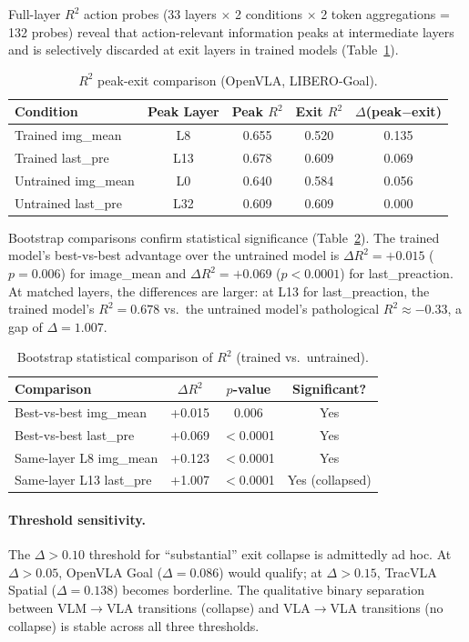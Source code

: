 \documentclass[10pt,letterpaper]{article}
\begin{document}
Full-layer $R^2$ action probes (33 layers $\times$ 2 conditions $\times$ 2 token aggregations = 132 probes) reveal that action-relevant information peaks at intermediate layers and is selectively discarded at exit layers in trained models (Table~\ref{tab:r2_profile}).

\begin{table}[h]
\centering
\caption{$R^2$ peak-exit comparison (OpenVLA, LIBERO-Goal).}
\label{tab:r2_profile}
\begin{tabular}{lcccc}
\toprule
Condition & Peak Layer & Peak $R^2$ & Exit $R^2$ & $\Delta$(peak$-$exit) \\
\midrule
Trained img\_mean & L8 & 0.655 & 0.520 & 0.135 \\
Trained last\_pre & L13 & 0.678 & 0.609 & 0.069 \\
Untrained img\_mean & L0 & 0.640 & 0.584 & 0.056 \\
Untrained last\_pre & L32 & 0.609 & 0.609 & 0.000 \\
\bottomrule
\end{tabular}
\end{table}

Bootstrap comparisons confirm statistical significance (Table~\ref{tab:bootstrap_r2}). The trained model's best-vs-best advantage over the untrained model is $\Delta R^2 = +0.015$ ($p = 0.006$) for image\_mean and $\Delta R^2 = +0.069$ ($p < 0.0001$) for last\_preaction. At matched layers, the differences are larger: at L13 for last\_preaction, the trained model's $R^2 = 0.678$ vs.\ the untrained model's pathological $R^2 \approx -0.33$, a gap of $\Delta = 1.007$.

\begin{table}[h]
\centering
\caption{Bootstrap statistical comparison of $R^2$ (trained vs.\ untrained).}
\label{tab:bootstrap_r2}
\begin{tabular}{lccc}
\toprule
Comparison & $\Delta R^2$ & $p$-value & Significant? \\
\midrule
Best-vs-best img\_mean & +0.015 & 0.006 & Yes \\
Best-vs-best last\_pre & +0.069 & $<$0.0001 & Yes \\
Same-layer L8 img\_mean & +0.123 & $<$0.0001 & Yes \\
Same-layer L13 last\_pre & +1.007 & $<$0.0001 & Yes (collapsed) \\
\bottomrule
\end{tabular}
\end{table}

\paragraph{Threshold sensitivity.}
The $\Delta > 0.10$ threshold for ``substantial'' exit collapse is admittedly ad hoc. At $\Delta > 0.05$, OpenVLA Goal ($\Delta = 0.086$) would qualify; at $\Delta > 0.15$, TracVLA Spatial ($\Delta = 0.138$) becomes borderline. The qualitative binary separation between VLM$\to$VLA transitions (collapse) and VLA$\to$VLA transitions (no collapse) is stable across all three thresholds.
\end{document}
